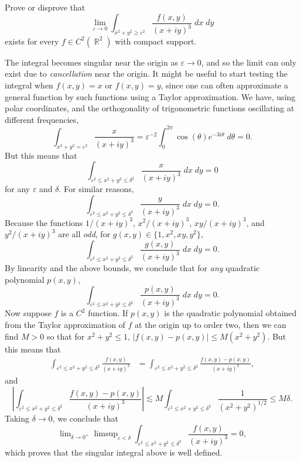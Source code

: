 \documentclass[answers]{exam}
\DeclareMathOperator{\RR}{\mathbb{R}}
\begin{document}
\begin{questions}
\question Prove or disprove that
%
\[ \lim_{\varepsilon \to 0} \int_{x^2 + y^2 \geq \varepsilon^2} \frac{f(x,y)}{(x + iy)^3}\; dx\; dy \]
%
exists for every $f \in C^2(\RR^2)$ with compact support. 
\begin{solution}
	The integral becomes singular near the origin as $\varepsilon \to 0$, and so the limit can only exist due to \emph{cancellation} near the origin. It might be useful to start testing the integral when $f(x,y) = x$ or $f(x,y) = y$, since one can often approximate a general function by such functions using a Taylor approximation. We have, using polar coordinates, and the orthogonality of  trigonometric functions oscillating at different frequencies,
	\[ \int_{x^2 + y^2 = \varepsilon^2} \frac{x}{(x + iy)^3} = \varepsilon^{-2} \int_0^{2\pi} \cos(\theta) e^{-3i \theta}\;d \theta = 0. \]
	But this means that
	\[ \int_{\varepsilon^2 \leq x^2 + y^2 \leq \delta^2} \frac{x}{(x + iy)^3}\; dx\; dy = 0 \]
	for any $\varepsilon$ and $\delta$. For similar reasons,
	\[ \int_{\varepsilon^2 \leq x^2 + y^2 \leq \delta^2} \frac{y}{(x + iy)^3}\; dx\; dy = 0. \]
	Because the functions $1/(x + iy)^3$, $x^2/(x + iy)^3$, $xy/(x + iy)^3$, and $y^2/(x + iy)^3$ are all \emph{odd}, for $g(x,y) \in \{ 1, x^2, xy, y^2 \}$,
	\[ \int_{\varepsilon^2 \leq x^2 + y^2 \leq \delta^2} \frac{g(x,y)}{(x + iy)^3}\; dx\; dy = 0. \]
	By linearity and the above bounds, we conclude that for \emph{any} quadratic polynomial $p(x,y)$,
	\[ \int_{\varepsilon^2 \leq x^2 + y^2 \leq \delta^2} \frac{p(x,y)}{(x + iy)^3}\; dx\; dy = 0. \]
	Now suppose $f$ is a $C^2$ function. If $p(x,y)$ is the quadratic polynomial obtained from the Taylor approximation of $f$ at the origin up to order two, then we can find $M > 0$ so that for $x^2 + y^2 \leq 1$, $|f(x,y) - p(x,y)| \leq M (x^2 + y^2)$. But this means that
	\begin{align*}
		\int_{\varepsilon^2 \leq x^2 + y^2 \leq \delta^2} \frac{f(x,y)}{(x + iy)^3} &= \int_{\varepsilon^2 \leq x^2 + y^2 \leq \delta^2} \frac{f(x,y) - p(x,y)}{(x + iy)^3},
	\end{align*}
	and
	\[ \left| \int_{\varepsilon^2 \leq x^2 + y^2 \leq \delta^2} \frac{f(x,y) - p(x,y)}{(x + iy)^3} \right| \lesssim M \int_{\varepsilon^2 \leq x^2 + y^2 \leq \delta^2} \frac{1}{(x^2 + y^2)^{1/2}} \leq M \delta. \]
	Taking $\delta \to 0$, we conclude that
	\[ \lim\nolimits_{\delta \to 0^+} \limsup\nolimits_{\varepsilon < \delta} \int_{\varepsilon^2 \leq x^2 + y^2 \leq \delta^2} \frac{f(x,y)}{(x + iy)^3} = 0, \]
	which proves that the singular integral above is well defined.
\end{solution}


\end{questions}
\end{document}
